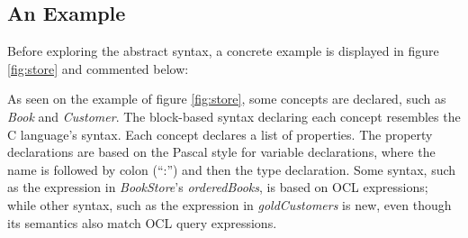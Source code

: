 \subsection{An Example}\label{subsec:example}

Before exploring the abstract syntax, a concrete example is displayed in figure \ref{fig:store} and commented below:



As seen on the example of figure \ref{fig:store}, some concepts are declared, such as \emph{Book} and \emph{Customer}. 
The block-based syntax declaring each concept resembles the C \cite{clang} language's syntax. 
Each concept declares a list of properties.
The property declarations are based on the Pascal \cite{pascal} style for variable declarations, where the name is followed by colon (``:'') and then the type declaration.
Some syntax, such as the expression in \emph{BookStore}'s \emph{orderedBooks}, is based on OCL \cite{ocl} expressions; while other syntax, such as the expression in \emph{goldCustomers} is new, even though its semantics also match OCL \cite{ocl} query expressions.
